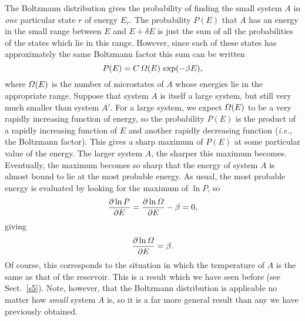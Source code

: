 The Boltzmann distribution gives the probability of finding the small system $A$
in {\em one} particular state $r$ of energy $E_r$. The probability
$P(E)$ that $A$ has an energy in the small range between $E$ and $E + \delta E$ 
is just the sum of all the probabilities of the states which lie in this
range. However, since each of these states has approximately the same Boltzmann
factor this sum can be written
\begin{equation}
P(E) = C \,{\mit\Omega}(E)\,\exp(-\beta E),
\end{equation}
where ${\mit\Omega}(E)$ is the number of microstates of $A$ whose energies lie 
in the appropriate 
 range. Suppose that system $A$ is itself a large system, but still very
much smaller than system $A'$. For a large system, we expect ${\mit\Omega}(E)$ to
be a very rapidly increasing function of energy, so the probability $P(E)$
is the product of a rapidly increasing function  of $E$ and another
 rapidly decreasing
function ({\em i.e.}, the Boltzmann factor). This gives  a sharp
maximum of $P(E)$ at some particular value of the energy. The larger system $A$,
the sharper this maximum becomes. Eventually, the maximum becomes so sharp
that the energy of system $A$ is almost bound to lie at the most probable energy.
As usual, the most probable energy is evaluated by looking for the maximum of
$\ln P$, so
\begin{equation}
\frac{\partial \ln P}{\partial E} = \frac{\partial \ln {\mit\Omega}}{\partial E} 
-\beta =0,
\end{equation}
giving
\begin{equation}
\frac{\partial \ln {\mit\Omega}}{\partial E} = \beta.
\end{equation}
Of course, this corresponds to the situation in which  the temperature
of $A$ is the same as that of the reservoir. This is a result which we
have seen before (see Sect.~\ref{s5}). Note, however, that the Boltzmann 
distribution is applicable no matter how {\em small}\/ system $A$ is, so 
it is a far more
general result than any we have previously obtained. 

